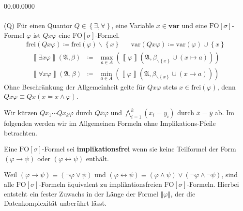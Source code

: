 \begin{labeling}{00.00.0000}
\begin{eqnarray*}
\end{eqnarray*}
\item [{(Q)}] Für einen Quantor $Q\in\left\{ \exists,\forall\right\} $,
eine Variable $x\in\mathbf{var}$ und eine $\mathrm{FO}\left[\sigma\right]$-Formel
$\varphi$ ist $Qx\varphi$ eine $\mathrm{FO}\left[\sigma\right]$-Formel.
\begin{eqnarray*}
\mathrm{frei}\left(Qx\varphi\right)\coloneqq\mathrm{frei}\left(\varphi\right)\backslash\left\{ x\right\}  &  & \mathrm{var}\left(Qx\varphi\right)\coloneqq\mathrm{var}\left(\varphi\right)\cup\left\{ x\right\} 
\end{eqnarray*}
\begin{eqnarray*}
\left\llbracket \exists x\varphi\right\rrbracket \left(\mathfrak{A},\beta\right) & \coloneqq & \max_{a\in A}\left(\left\llbracket \varphi\right\rrbracket \left(\mathfrak{A},\beta_{\backslash\left\{ x\right\} }\cup\left(x\mapsto a\right)\right)\right)\\
\left\llbracket \forall x\varphi\right\rrbracket \left(\mathfrak{A},\beta\right) & \coloneqq & \min_{a\in A}\left(\left\llbracket \varphi\right\rrbracket \left(\mathfrak{A},\beta_{\backslash\left\{ x\right\} }\cup\left(x\mapsto a\right)\right)\right)
\end{eqnarray*}
Ohne Beschränkung der Allgemeinheit gelte für $Qx\varphi$ stets $x\in\mathrm{frei}\left(\varphi\right)$,
denn $Qx\varphi\equiv Qx\left(x\dot{=}x\wedge\varphi\right)$.
\end{labeling}
Wir kürzen $Qx_{1}\cdots Qx_{k}\varphi$ durch $Q\bar{x}\varphi$
und $\bigwedge_{i=1}^{k}\left(x_{i}=y_{i}\right)$ durch $\bar{x}=\bar{y}$
ab. Im folgenden werden wir im Allgemeinen Formeln ohne Implikations-Pfeile
betrachten.
\begin{defn}
Eine $\mathrm{FO}\left[\sigma\right]$-Formel sei \textbf{implikationsfrei
}wenn sie keine Teilformel der Form $\left(\varphi\rightarrow\psi\right)$
oder $\left(\varphi\leftrightarrow\psi\right)$ enthält.
\end{defn}
Weil $\left(\varphi\rightarrow\psi\right)\equiv\left(\neg\varphi\vee\psi\right)$
und $\left(\varphi\leftrightarrow\psi\right)\equiv\left(\varphi\wedge\psi\right)\vee\left(\neg\varphi\wedge\neg\psi\right)$,
sind alle $\mathrm{FO}\left[\sigma\right]$-Formeln äquivalent zu
implikationsfreien $\mathrm{FO}\left[\sigma\right]$-Formeln. Hierbei
entsteht ein fester Zuwachs in der Länge der Formel $\left\Vert \varphi\right\Vert $,
der die Datenkomplexität unberührt lässt.

